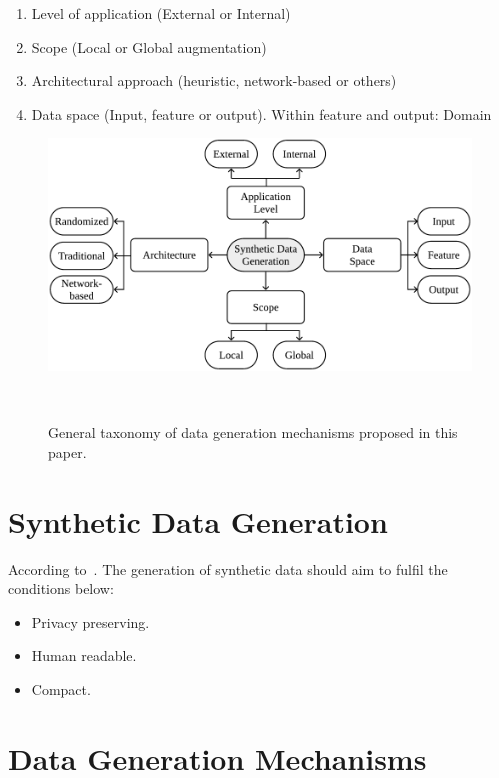 \documentclass[parskip=full]{scrartcl}
\begin{document}
\begin{enumerate}
    \item Level of application (External or Internal)
    \item Scope (Local or Global augmentation)
    \item Architectural approach (heuristic, network-based or others)
    \item Data space (Input, feature or output). Within feature and output: Domain
\end{enumerate}

\begin{figure}
	\centering
	\includegraphics[width=.8\linewidth]{../analysis/data-generation-taxonomy}
    \caption{General taxonomy of data generation mechanisms proposed in this
        paper.
    }~\label{fig:data-generation-taxonomy}
\end{figure}


\section{Synthetic Data Generation}

According to~\cite{assefa2020generating}. The generation of synthetic data
should aim to fulfil the conditions below:

\begin{itemize}
    \item Privacy preserving.
    \item Human readable.
    \item Compact.
\end{itemize}

\section{Data Generation Mechanisms}
\end{document}
